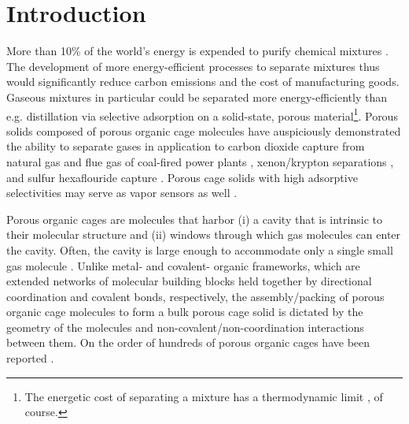 \documentclass[journal=jacsat,manuscript=article,layout=traditional]{achemso}
\begin{document}
\section{Introduction}
More than 10\% of the world's energy is expended to purify chemical mixtures \cite{sholl2016seven}. The development of more energy-efficient processes to separate mixtures thus would significantly reduce carbon emissions and the cost of manufacturing goods. Gaseous mixtures in particular could be separated more energy-efficiently than e.g. distillation \cite{doe_study} via selective adsorption on a solid-state, porous material\footnote[2]{The energetic cost of separating a mixture has a thermodynamic limit \cite{bhown2011analysis}, of course.}. Porous solids composed of porous organic cage molecules \cite{tozawa2009porous} have auspiciously demonstrated the ability to separate gases \cite{hasell2016porous} in application to carbon dioxide capture from natural gas \cite{mastalerz2011salicylbisimine} and flue gas of coal-fired power plants \cite{tian2009amorphous,hong2015porphyrin}, xenon/krypton separations \cite{chen2014separation,patil2016noria}, and sulfur hexaflouride capture \cite{sf6seps}. Porous cage solids with high adsorptive selectivities may serve as vapor sensors as well \cite{brutschy2012porous,brutschy2013direct}.

Porous organic cages \cite{hasell2016porous,holst2010porous,cooper2017porousacs} are molecules that harbor (i) a cavity that is intrinsic to their molecular structure and (ii) windows through which gas molecules can enter the cavity. Often, the cavity is large enough to accommodate only a single small gas molecule \cite{miklitz2017computational}. Unlike metal- \cite{furukawa2013chemistry} and covalent- \cite{diercks2017atom} organic frameworks, which are extended networks of molecular building blocks held together by directional coordination and covalent bonds, respectively, the assembly/packing of porous organic cage molecules to form a bulk porous cage solid is dictated by the geometry of the molecules and non-covalent/non-coordination interactions between them\cite{mckeown2010nanoporous}. 
On the order of hundreds of porous organic cages have been reported \cite{evans2016computational}.
\end{document}
